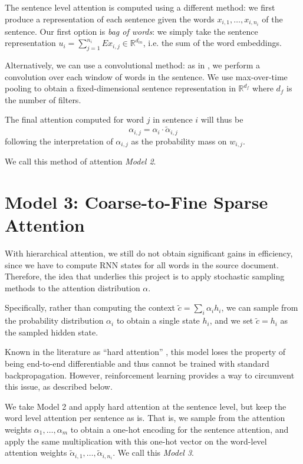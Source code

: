\documentclass[11pt]{report}
\begin{document}
The sentence level attention is computed using a different method: we first produce a representation of each sentence given the words $x_{i,1}, \ldots, x_{i, n_i}$ of the sentence. Our first option is \emph{bag of words}: we simply take the sentence representation $u_i = \sum_{j=1}^{n_i} Ex_{i,j} \in \mathbb{R}^{d_{in}}$, i.e. the sum of the word embeddings.

Alternatively, we can use a convolutional method: as in \cite{kim2014convolutional}, we perform a convolution over each window of words in the sentence. We use max-over-time pooling to obtain a fixed-dimensional sentence representation in $\mathbb{R}^{d_f}$ where $d_f$ is the number of filters.


The final attention computed for word $j$ in sentence $i$ will thus be
$$\alpha_{i,j} = \alpha_i \cdot \widetilde{\alpha}_{i,j}$$
following the interpretation of $\alpha_{i,j}$ as the probability mass on $w_{i,j}$.

We call this method of attention \emph{Model 2}.

\section{Model 3: Coarse-to-Fine Sparse Attention}

With hierarchical attention, we still do not obtain significant gains in efficiency, since we have to compute RNN states for all words in the source document. Therefore, the idea that underlies this project is to apply stochastic sampling methods to the attention distribution $\alpha$.

Specifically, rather than computing the context $\widetilde{c} = \sum_i \alpha_i h_i$, we can sample from the probability distribution $\alpha_i$ to obtain a single state $h_i$, and we set $\widetilde{c} = h_i$ as the sampled hidden state.

Known in the literature as ``hard attention'' \citep{xu2015captioning}, this model loses the property of being end-to-end differentiable and thus cannot be trained with standard backpropagation. However, reinforcement learning provides a way to circumvent this issue, as described below.

We take Model 2 and apply hard attention at the sentence level, but keep the word level attention per sentence as is. That is, we sample from the attention weights $\alpha_1, \ldots, \alpha_m$ to obtain a one-hot encoding for the sentence attention, and apply the same multiplication with this one-hot vector on the word-level attention weights $\widetilde{\alpha}_{i,1}, \ldots, \widetilde{\alpha}_{i,n_i}$. We call this \emph{Model 3}.
\end{document}
